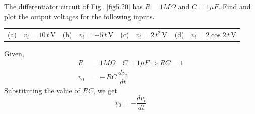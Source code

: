 \begin{example}\label{exam5.26}
The differentiator circuit of Fig.~\ref{fig5.20} has $R=1 M\Omega$ and $C=1\mu F$. Find and plot the output voltages for the following inputs.
\begin{center}
\begin{tabular}{r@{\;}l@{\qquad}r@{\;}l@{\qquad}r@{\;}l@{\qquad}r@{\;}l}
(a) & $v_{i}=10\,t\,\text{V}$ & (b) & $v_{i}=-5\,t\,\text{V}$ &
(c) & $v_{i}=2\,t^{2}\,\text{V}$ & (d) & $v_{i}=2\cos 2\,t\,\text{V}$
\end{tabular}
\end{center}
\end{example}

\eject

\begin{solution}
Given,
\begin{align*}
R &= 1 M\Omega\quad C=1\mu F\Rightarrow RC=1\\[3pt]
v_{0} &=-\, RC\,\dfrac{dv_{i}}{dt}
\end{align*}
Substituting the value of $RC$, we get
$$
v_{0}=-\dfrac{dv_{i}}{dt}
$$
\smallskip
{}
\end{solution}
